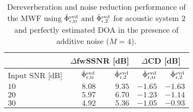 \documentclass[10pt]{IEEEtran}
\begin{document}
\begin{table}[t!]
\begin{center}
  \caption{Dereverberation and noise reduction performance of the MWF using $\hat{\Phi}^{\rm evd}_{\rm r,tr}$ and $\hat{\Phi}^{\rm evd}_{\rm r,2}$  for acoustic system $2$ and perfectly estimated DOA in the presence of additive noise ($M = 4$).}
  \label{tbl: spa_reg2}
  \begin{tabularx}{\linewidth}{Xrrrr}
    \toprule
    & \multicolumn{2}{c}{$\Delta$fwSSNR [dB]} & \multicolumn{2}{c}{$\Delta$CD [dB]} \\
    \midrule
    Input SNR [dB] & $\hat{\Phi}^{\rm evd}_{\rm r,tr}$ & $\hat{\Phi}^{\rm evd}_{\rm r,2}$ & $\hat{\Phi}^{\rm evd}_{\rm r,tr}$ & $\hat{\Phi}^{\rm evd}_{\rm r,2}$ \\
    \midrule
    $10$ & $8.08$ & $9.35$ & $-1.65$ & $-1.63$ \\
    $20$ & $5.97$ & $6.70$ & $-1.23$ & $-1.14$ \\
    $30$ & $4.92$ & $5.36$ & $-1.05$ & $-0.93$ \\
    \bottomrule
  \end{tabularx}
\end{center}
\end{table}



\end{document}
